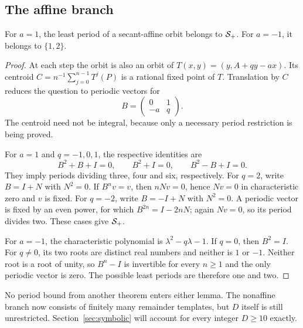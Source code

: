 \subsection{The affine branch}
\begin{lemma}\label{lem:affine}
For $a=1$, the least period of a secant-affine orbit belongs to
$\mathcal S_+$. For $a=-1$, it belongs to $\{1,2\}$.
\end{lemma}
\begin{proof}
At each step the orbit is also an orbit of
$T(x,y)=(y,A+qy-ax)$. Its centroid
$C=n^{-1}\sum_{j=0}^{n-1}T^j(P)$ is a rational fixed point of $T$.
Translation by $C$ reduces the question to periodic vectors for
\begin{equation}\label{eq:matrix}
 B=\begin{pmatrix}0&1\\-a&q\end{pmatrix}.
\end{equation}
The centroid need not be integral, because only a necessary period
restriction is being proved.

For $a=1$ and $q=-1,0,1$, the respective identities are
\[
 B^2+B+I=0,\qquad B^2+I=0,\qquad B^2-B+I=0.
\]
They imply periods dividing three, four and six, respectively.
For $q=2$, write $B=I+N$ with $N^2=0$. If $B^n v=v$, then
$nNv=0$, hence $Nv=0$ in characteristic zero and $v$ is fixed.
For $q=-2$, write $B=-I+N$ with $N^2=0$. A periodic vector is
fixed by an even power, for which $B^{2n}=I-2nN$; again $Nv=0$,
so its period divides two. These cases give $\mathcal S_+$.

For $a=-1$, the characteristic polynomial is $\lambda^2-q\lambda-1$.
If $q=0$, then $B^2=I$. For $q\ne0$, its two roots are distinct
real numbers and neither is $1$ or $-1$. Neither root is a root
of unity, so $B^n-I$ is invertible for every $n\ge1$ and the only
periodic vector is zero. The possible least periods are therefore
one and two.
\end{proof}

No period bound from another theorem enters either lemma. The
nonaffine branch now consists of finitely many remainder templates,
but $D$ itself is still unrestricted. Section~\ref{sec:symbolic}
will account for every integer $D\ge10$ exactly.
